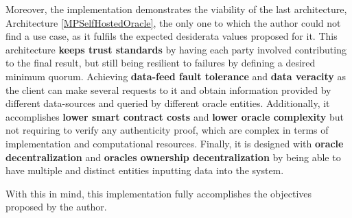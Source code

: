Moreover, the implementation demonstrates the viability of the last architecture, Architecture \ref{MPSelfHostedOracle}, the only one to which the author could not find a use case, as it fulfils the expected desiderata values proposed for it. This architecture \textbf{keeps trust standards} by having each party involved contributing to the final result, but still being resilient to failures by defining a desired minimum quorum. Achieving \textbf{data-feed fault tolerance} and \textbf{data veracity} as the client can make several requests to it and obtain information provided by different data-sources and queried by different oracle entities. Additionally, it accomplishes \textbf{lower smart contract costs} and \textbf{lower oracle complexity} but not requiring to verify any authenticity proof, which are complex in terms of implementation and computational resources. Finally, it is designed with \textbf{oracle decentralization} and \textbf{oracles ownership decentralization} by being able to have multiple and distinct entities inputting data into the system.

With this in mind, this implementation fully accomplishes the objectives proposed by the author.